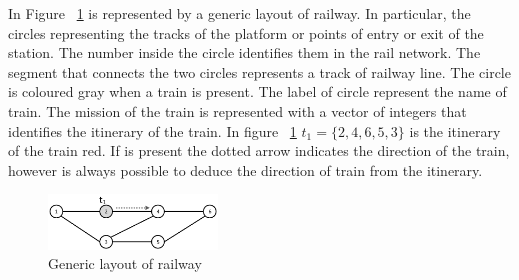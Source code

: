 \documentclass{ewic}
\begin{document}
			In Figure ~\ref{fig:rappresent} is represented by a generic layout of railway.
			In particular, the circles representing the tracks of the platform or points of entry or exit of the station. The number inside the circle identifies them in the rail network.
			The segment that connects the two circles represents a track of railway line.
			The circle is coloured gray when a train is present. The label of circle represent the name of train. The mission of the train is represented with a vector of integers that identifies the itinerary of the train. In figure ~\ref{fig:rappresent} $t_1=\{2,4,6,5,3\}$ is the itinerary of the train red. If is present the dotted arrow indicates the direction of the train, however is always possible to deduce the direction of train from the itinerary.
			
			\begin{figure}[htp]
				\begin{centering}	
				\includegraphics[width=0.4\textwidth, clip]{img/rappresentazione}
				\caption{Generic layout of railway}
				\label{fig:rappresent}
				\end{centering}
			\end{figure}
			
			
\end{document}
